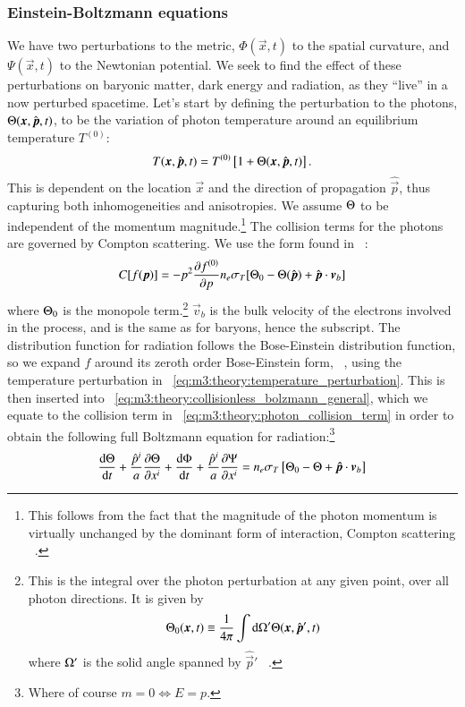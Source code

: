 \subsubsection{Einstein-Boltzmann equations}
    We have two perturbations to the metric, $\Phi(\vec{x}, t)$ to the spatial curvature, and $\Psi(\vec{x},t)$ to the Newtonian potential. We seek to find the effect of these perturbations on baryonic matter, dark energy and radiation, as they ``live'' in a now perturbed spacetime. Let's start by defining the perturbation to the photons, $\Theta(\boldsymbol{x}, \hat{\boldsymbol{p}}, t)$, to be the variation of photon temperature around an equilibrium temperature $T^{(0)}$:
    \begin{equation}\label{eq:m3:theory:temperature_perturbation}
        T(\boldsymbol{x}, \hat{\boldsymbol{p}}, t) = T^{(0)}\left[1+\Theta(\boldsymbol{x}, \hat{\boldsymbol{p}}, t)\right].
    \end{equation}
    This is dependent on the location $\vec{x}$ and the direction of propagation $\hat{\vec{p}}$, thus capturing both inhomogeneities and anisotropies. We assume $\Theta$ to be independent of the momentum magnitude.\footnote{This follows from the fact that the magnitude of the photon momentum is virtually unchanged by the dominant form of interaction, Compton scattering ~\cite{dodelson2020modern}.}
    The collision terms for the photons are governed by Compton scattering. We use the form found in ~\cite[Eq. 5.22]{dodelson2020modern}:
    \begin{equation}\label{eq:m3:theory:photon_collision_term}
        C[f(\boldsymbol{p})] = -p^2\pdv{f^{(0)}}{p}n_e\sigma_T[\Theta_0 - \Theta(\hat{\boldsymbol{p}}) + \hat{\boldsymbol{p}}\cdot\boldsymbol{v}_b]
    \end{equation}
    where $\Theta_0$ is the monopole term.\footnote{This is the integral over the photon perturbation at any given point, over all photon directions. It is given by $$\Theta_0(\boldsymbol{x}, t) \equiv \frac{1}{4\pi}\int \mathrm{d}\Omega'\Theta(\boldsymbol{x}, \hat{\boldsymbol{p}}', t)$$ where $\Omega'$ is the solid angle spanned by $\hat{\vec{p}}'$ ~\cite{dodelson2020modern}.} $\vec{v}_b$ is the bulk velocity of the electrons involved in the process, and is the same as for baryons, hence the subscript. The distribution function for radiation follows the Bose-Einstein distribution function, so we expand $f$ around its zeroth order Bose-Einstein form, ~\cite[Eq. 5.2-5.9]{dodelson2020modern}, using the temperature perturbation in ~\cref{eq:m3:theory:temperature_perturbation}. This is then inserted into ~\cref{eq:m3:theory:collisionless_bolzmann_general}, which we equate to the collision term in ~\cref{eq:m3:theory:photon_collision_term} in order to obtain the following full Boltzmann equation for radiation:\footnote{Where of course $m=0\iff E=p$.}
    \begin{equation}\label{eq:m3:theory:boltzmann_equation_radiation_full}
        \dv{\Theta}{t} + \frac{\hat{p}^i}{a}\pdv{\Theta}{x^i} + \dv{\Phi}{t} + \frac{\hat{p}^i}{a}\pdv{\Psi}{x^i} = n_e\sigma_T\left[\Theta_0-\Theta+\boldsymbol{\hat{p}}\cdot\boldsymbol{v}_b\right]
    \end{equation} 
    
